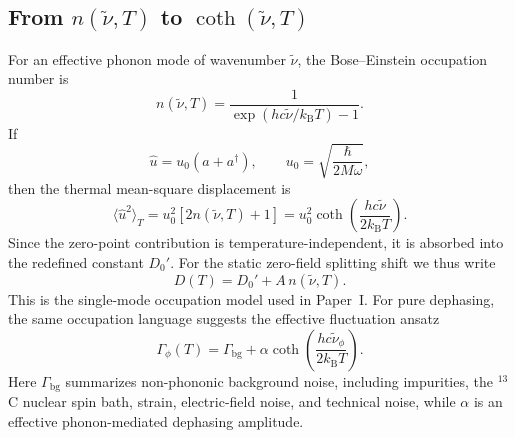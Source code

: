 \documentclass[12pt,a4paper]{article}
\begin{document}
\subsection{From $n(\tilde{\nu},T)$ to $\coth(\tilde{\nu},T)$}
For an effective phonon mode of wavenumber $\tilde{\nu}$, the Bose--Einstein occupation number is
\begin{equation}
n(\tilde{\nu},T)=
\frac{1}{\exp(hc\tilde{\nu}/k_{\mathrm B}T)-1}.
\label{eq:bose_occupation}
\end{equation}
If
\begin{equation}
\hat u=u_0(a+a^\dagger), \qquad u_0=\sqrt{\frac{\hbar}{2M\omega}},
\end{equation}
then the thermal mean-square displacement is
\begin{equation}
\langle \hat u^2\rangle_T = u_0^2[2n(\tilde{\nu},T)+1] = u_0^2 \coth\!\left(
\frac{hc\tilde{\nu}}{2k_{\mathrm B}T}
\right).
\label{eq:mean_square_displacement}
\end{equation}
Since the zero-point contribution is temperature-independent, it is absorbed into the redefined constant $D_0'$. For the static zero-field splitting shift we thus write
\begin{equation}
D(T)=D_0'+A\,n(\tilde{\nu},T).
\label{eq:D_model}
\end{equation}
This is the single-mode occupation model used in Paper~I. For pure dephasing, the same occupation language suggests the effective fluctuation ansatz
\begin{equation}
\Gamma_\phi(T) = \Gamma_{\mathrm{bg}} + \alpha \coth\!\left(
\frac{hc\tilde{\nu}_\phi}{2k_{\mathrm B}T}
\right).
\label{eq:dephasing_ansatz}
\end{equation}
Here $\Gamma_{\mathrm{bg}}$ summarizes non-phononic background noise, including impurities, the $^{13}$C nuclear spin bath, strain, electric-field noise, and technical noise, while $\alpha$ is an effective phonon-mediated dephasing amplitude.
\end{document}
